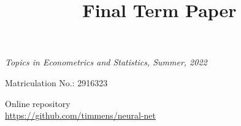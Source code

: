 \begin{frontmatter}

\title{Final Term Paper}

\vspace{0.5em}
\textit{Topics in Econometrics and Statistics, Summer, 2022}

\author{ }


\vspace{0.5em}
Matriculation No.: 2916323

\vspace{0.5em}
Online repository\\
\url{https://github.com/timmens/neural-net}

\vspace{2em}
\begin{abstract}
    
\end{abstract}

\end{frontmatter}
